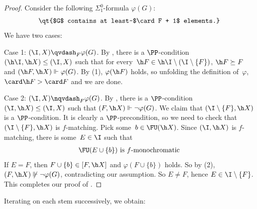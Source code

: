 \documentclass{article}
\numberwithin{theorem}{section}
\newtheorem{lemma}[theorem]{Lemma}
\begin{document}
\begin{proof}
Consider the following $\Sigma^0_1$-formula $\varphi(G)$:
\begin{align*}
\text{\qt{$G$ contains at least~$\card F + 1$ elements.}}
\end{align*}
We have two cases:
\smallskip

\noindent
Case 1: $(\I, X) \qvdash_F \varphi(G)$. By , there is a $\PP$-condition $(\h \I, \h X) \leq (\I, X)$ such that for every~$\h F \in \h \I \setminus (\I \setminus \{F\})$, $\h F \succeq F$ and $(\h F, \h X) \Vdash \varphi(G)$. By (1), $\varphi(\h F)$ holds, so unfolding the definition of~$\varphi$, $\card \h F > \card F$ and we are done.
\smallskip

\noindent
Case 2: $(\I, X) \nqvdash_F \varphi(G)$. By , there is a $\PP$-condition $(\I, \h X) \leq (\I, X)$ such that $(F, \h X) \Vdash \neg \varphi(G)$. We claim that $(\I \setminus \{F\}, \h X)$ is a $\PP$-condition.
It is clearly a $\PP$-precondition, so we need to check that $(\I \setminus \{F\}, \h X)$ is $f$-matching.
Pick some~$b \in \FU(\h X)$. Since $(\I, \h X)$ is $f$-matching, there is some~$E \in \I$ such that
\begin{align}
\text{$\FU(E \cup \{b\})$ is $f$-monochromatic}
\end{align}
If $E = F$, then $F \cup \{b\} \in [F, \h X]$ and $\varphi(F \cup \{b\})$ holds. So by (2), $(F, \h X) \not\Vdash \neg \varphi(G)$, contradicting our assumption. So $E \neq F$, hence $E \in \I \setminus \{F\}$.
This completes our proof of .
\end{proof}

Iterating  on each stem successively, we obtain:

\end{document}
